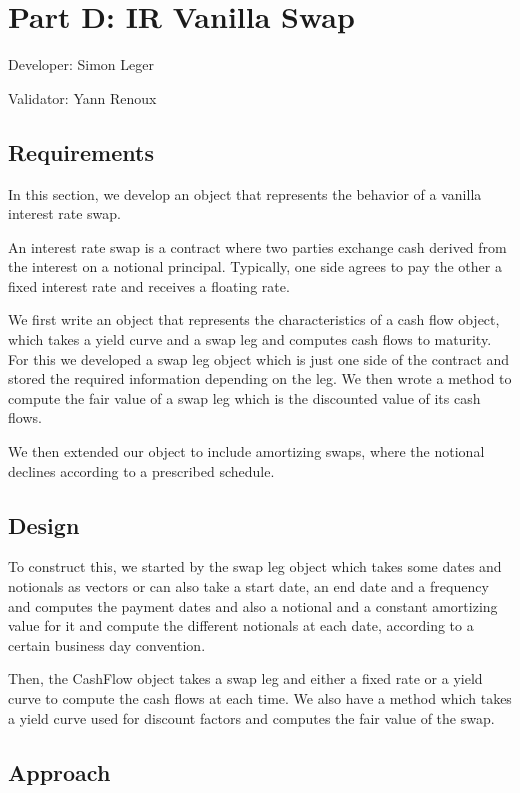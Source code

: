 \chapter{Part D: IR Vanilla Swap}
Developer: Simon Leger

\noindent Validator: Yann Renoux



\section{Requirements}

In this section, we develop an object that represents the
behavior of a vanilla interest rate swap.

An interest rate swap is a contract where two parties exchange
cash derived from the interest on a notional principal. Typically,
one side agrees to pay the other a fixed interest rate and receives
a floating rate.

We first write an object that represents the characteristics of a
cash flow object, which takes a yield curve and a swap leg and
computes cash flows to maturity. For this we developed a swap leg
object which is just one side of the contract and stored the
required information depending on the leg. We then wrote a method
to compute the fair value of a swap leg which is the discounted
value of its cash flows.

We then extended our object to include amortizing swaps, where the
notional declines according to a prescribed schedule.


\section{Design }
To construct this, we started by the swap leg object which takes
some dates and notionals as vectors or can also take a start date,
an end date and a frequency and computes the payment dates and also
a notional and a constant amortizing value for it and compute the
different notionals at each date, according to a certain business
day convention.

Then, the CashFlow object takes a swap leg and either a fixed rate
or a yield curve to compute the cash flows at each time. We also
have a method which takes a yield curve used for discount factors
and computes the fair value of the swap.


\section{Approach}

